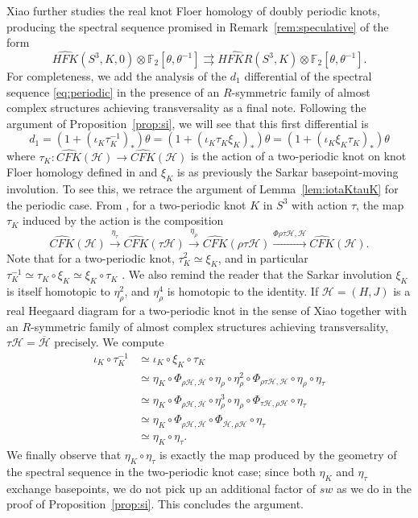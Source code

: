 \documentclass[11pt,reqno]{amsart}
\theoremstyle{definition}
\theoremstyle{remark}
\newcommand{\cH}{\mathcal{H}}
\newcommand{\CFK}{\mathit{CFK}}
\newcommand{\HFK}{\mathit{HFK}}
\newcommand\CFKhat{\widehat{\CFK}}
\newcommand\HFKhat{\widehat{\HFK}}
\newcommand \HFKR{ \widehat{\mathit{HFKR}}}
\numberwithin{equation}{section}
\newcommand\co{\colon}
\begin{document}
Xiao further studies the real knot Floer homology of doubly periodic knots, producing \cite[Theorem 4.11]{Xiao:real-link} the spectral sequence promised in Remark~\ref{rem:speculative} of the form
%
\begin{equation} \label{eq:periodic} \HFKhat(S^3, K, 0) \otimes \mathbb F_2[\theta, \theta^{-1}] \rightrightarrows \HFKR(S^3,K) \otimes \mathbb F_2[\theta, \theta^{-1}].
\end{equation}
%
For completeness, we add the analysis of the $d_1$ differential of the spectral sequence \eqref{eq:periodic} in the presence of an $R$-symmetric family of almost complex structures achieving transversality as a final note. Following the argument of Proposition~\ref{prop:si}, we will see that this first differential is
%
\[ d_1 = (1 +(\iota_K \tau_K^{-1})_*)\theta = (1 +(\iota_K\tau_K\xi_K)_*)\theta = (1 +(\iota_K\xi_K \tau_K)_*)\theta\]
%
where $\tau_K \co \CFKhat(\cH) \rightarrow \CFKhat(\cH)$ is the action of a two-periodic knot on knot Floer homology defined in \cite[Section 8]{DMS:equivariant} and $\xi_K$ is as previously the Sarkar basepoint-moving involution.  To see this, we retrace the argument of Lemma~\ref{lem:iotaKtauK} for the periodic case. From \cite[Section 8.1]{DMS:equivariant}, for a two-periodic knot $K$ in $S^3$ with action $\tau$, the map $\tau_K$ induced by the action is the composition 
%
\[ \CFKhat(\cH) \xrightarrow{\eta_{\tau}} \CFKhat(\tau\cH) \xrightarrow{\eta_{\rho}} \CFKhat(\rho \tau \cH) \xrightarrow {\Phi{\rho \tau \cH, \cH}} \CFKhat(\cH). \]
%
Note that for a two-periodic knot, $\tau_K^2 \simeq \xi_K$, and in particular $\tau_K^{-1} \simeq \tau_K \circ \xi_K \simeq \xi_K \circ \tau_K$ \cite[Theorem 8.1]{DMS:equivariant}. We also remind the reader that the Sarkar involution $\xi_K$ is itself homotopic to $\eta_{\rho}^2$, and $\eta_{\rho}^4$ is homotopic to the identity. If $\cH = (H,J)$ is a real Heegaard diagram for a two-periodic knot in the sense of Xiao \cite[Section 2]{Xiao:real-link} together with an $R$-symmetric family of almost complex structures achieving transversality, $\tau \cH = \overline{\cH}$ precisely. We compute 
%
\begin{align*} 
\iota_K \circ \tau_K^{-1} &\simeq \iota_K \circ \xi_K \circ \tau_K \\
						&\simeq \eta_K \circ \Phi_{\rho\cH, \overline{\cH}} \circ \eta_{\rho}\circ \eta_{\rho}^2 \circ \Phi_{\rho \tau \cH, \cH} \circ \eta_{\rho} \circ \eta_{\tau} \\
						&\simeq \eta_K \circ \Phi_{\rho\cH, \overline{\cH}} \circ \eta_{\rho}^3 \circ \eta_{\rho} \circ \Phi_{\tau \cH, \rho\cH} \circ \eta_{\tau} \\
						& \simeq \eta_K \circ \Phi_{\rho\cH, \overline{\cH}}  \circ \Phi_{\overline{\cH}, \rho\cH} \circ \eta_{\tau} \\
						&\simeq \eta_K \circ \eta_{\tau}.
\end{align*}
%
We finally observe that $\eta_K\circ\eta_{\tau}$ is exactly the map produced by the geometry of the spectral sequence in the two-periodic knot case; since both $\eta_K$ and $\eta_{\tau}$ exchange basepoints, we do not pick up an additional factor of $sw$ as we do in the proof of Proposition~\ref{prop:si}. This concludes the argument.
\end{document}
